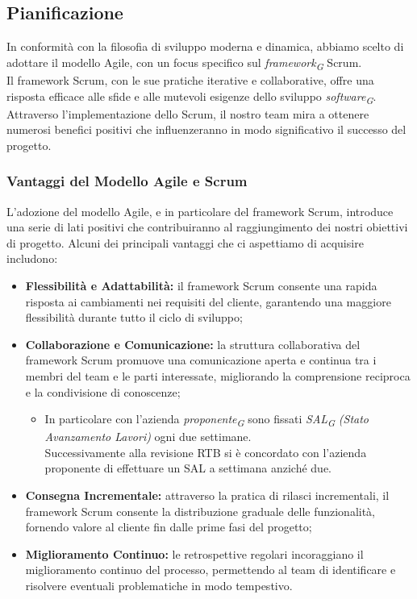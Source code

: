 \subsection{Pianificazione}\label{subsec:Pianificazione}
    In conformità con la filosofia di sviluppo moderna e dinamica, abbiamo scelto di adottare il modello Agile, con un focus specifico sul \textit{framework}\textsubscript{\textit{G}} Scrum. \\
    Il framework Scrum, con le sue pratiche iterative e collaborative, offre una risposta efficace alle sfide e alle mutevoli esigenze dello sviluppo \textit{software}\textsubscript{\textit{G}}.\\
    Attraverso l’implementazione dello Scrum, il nostro team mira a ottenere numerosi benefici positivi che influenzeranno in modo significativo il successo del progetto.
    

\subsubsection{Vantaggi del Modello Agile e Scrum}
    L'adozione del modello Agile, e in particolare del framework Scrum, introduce una serie di lati positivi che contribuiranno al raggiungimento dei nostri obiettivi di progetto.
    Alcuni dei principali vantaggi che ci aspettiamo di acquisire includono:

\begin{itemize}
    \item \textbf{Flessibilità e Adattabilità:}
        il framework Scrum consente una rapida risposta ai cambiamenti nei requisiti del cliente, garantendo una maggiore flessibilità durante tutto il ciclo di sviluppo;
    \item \textbf{Collaborazione e Comunicazione:}
        la struttura collaborativa del framework Scrum promuove una comunicazione aperta e continua tra i membri del team e le parti interessate, migliorando la comprensione reciproca e la condivisione di conoscenze;
        \begin{itemize}
            \item In particolare con l'azienda \textit{proponente}\textsubscript{\textit{G}} sono fissati \textit{SAL}\textsubscript{\textit{G}} \textit{(Stato Avanzamento Lavori)} ogni due settimane. \\
            Successivamente alla revisione RTB si è concordato con l'azienda proponente di effettuare un SAL a settimana anziché due.
        \end{itemize}
    \item \textbf{Consegna Incrementale:}
        attraverso la pratica di rilasci incrementali, il framework Scrum consente la distribuzione graduale delle funzionalità, fornendo valore al cliente fin dalle prime fasi del progetto;
    \item \textbf{Miglioramento Continuo:}
        le retrospettive regolari incoraggiano il miglioramento continuo del processo, permettendo al team di identificare e risolvere eventuali problematiche in modo tempestivo.
\end{itemize}

